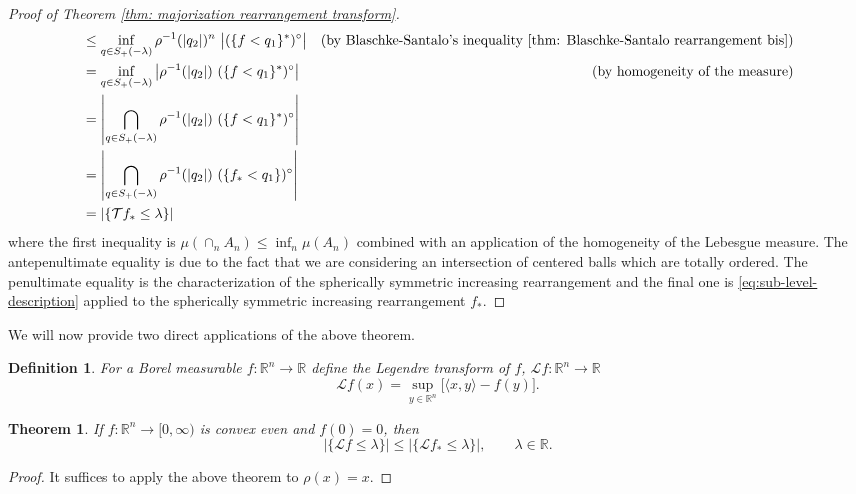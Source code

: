 \documentclass[11pt]{article}
\newtheorem{theorem}[conjecture]{Theorem}
\newtheorem{definition}[conjecture]{Definition}
\newcommand{\1}{[1]}
\begin{document}
\begin{proof}[Proof of Theorem \ref{thm: majorization rearrangement transform}]
\begin{align*}
            &\leq 
                \inf_{q \in S_+(- \lambda)} \rho^{-1}(|q_2|)^n \ \big| (\{ f < q_1 \}^*)^\circ \big |
                & (\mbox{by Blaschke-Santalo's inequality } \eqref{thm: Blaschke-Santalo rearrangement bis})
                    \\
            &= 
                \inf_{q \in S_+(- \lambda)}  \big| \rho^{-1}(|q_2|) \ (\{ f < q_1 \}^*)^\circ \big |
                & (\mbox{by homogeneity of the measure})
                    \\
            &=
                \left|\bigcap_{q \in S_+(- \lambda)} \rho^{-1}(|q_2|)  \ (\{ f < q_1 \}^*)^\circ \right|
                    \\
            &=
                \left|\bigcap_{q \in S_+(- \lambda)} \rho^{-1}(|q_2|) \ (\{ f_* < q_1 \})^\circ \right|
                    \\
            &=
                | \{ \mathcal{T} f_* \leq \lambda \} |
    \end{align*}
    where the first inequality is $\mu( \cap_n A_n) \leq \inf_n \mu(A_n)$ combined with an application of the homogeneity of the Lebesgue measure.  
    The antepenultimate equality is due to the fact that we are considering an intersection of centered balls which are totally ordered. The penultimate equality is the characterization of the spherically symmetric increasing rearrangement and the final one is \eqref{eq:sub-level-description} applied to the spherically symmetric increasing rearrangement $f_*$.
\end{proof}
We will now provide two direct applications of the above theorem.  
\begin{definition} \label{def:legendre}
    For a Borel measurable $f : \mathbb{R}^n \to \mathbb{R}$ define the Legendre transform of $f$,  $\mathcal{L}f:\mathbb{R}^n \to \mathbb{R}$
    \[
        \mathcal{L}f(x) = \sup_{y \in \mathbb{R}^n} \bigg[ \langle x , y  \rangle -  f(y) \bigg].
    \]
\end{definition}
 
\begin{theorem} \label{thm: majorization rearrangement Legendre}
        If $f: \mathbb{R}^n \to [0,\infty)$ is convex even and $f(0) = 0$, then
        \[
            | \{ \mathcal{L}f \leq \lambda \} | \leq  | \{ \mathcal{L}f_* \leq \lambda \} | , \qquad \lambda \in \mathbb{R}.
        \]
\end{theorem}
\begin{proof}
    It suffices to apply the above theorem to $\rho(x)=x$.
\end{proof}
\end{document}
